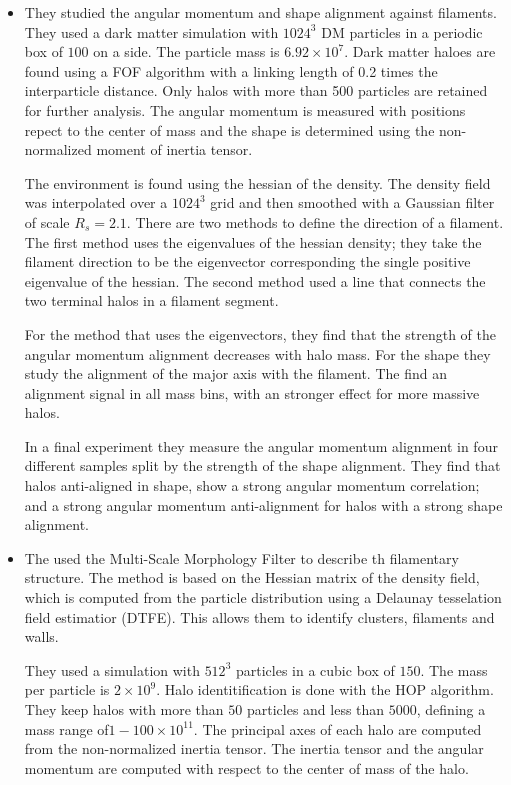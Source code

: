 \documentclass[useAMS,usenatbib]{mn2e}
\newcommand{\hMpc}{{\ifmmode{h^{-1}{\rm Mpc}}\else{$h^{-1}$Mpc }\fi}}
\newcommand{\hMsun}{{\ifmmode{h^{-1}{\rm
        {M_{\odot}}}}\else{$h^{-1}{\rm{M_{\odot}}}$~}\fi}}
\begin{document}
\begin{itemize}
\item
\citep{Zhang2009}

They studied the angular momentum and shape alignment against
filaments.  They used a dark matter simulation with $1024^3$ DM particles in a
periodic box of $100$ \hMpc on a side. The particle mass is
$6.92\times10^{7}$\hMsun. Dark matter haloes are found using a FOF
algorithm with a linking length of 0.2 times the interparticle
distance. Only halos with more than 500 particles are retained for
further analysis. The angular momentum is measured with positions
repect to the center of mass and the shape is determined using the
non-normalized moment of inertia tensor.

The environment is found using the hessian of the density. The density
field was interpolated over a $1024^3$ grid and then smoothed with a
Gaussian filter of scale $R_{s} = 2.1$\hMpc. There are two methods to
define the direction of a filament. The first method uses the
eigenvalues of the hessian density; they take the filament
direction to be the eigenvector corresponding the single positive
eigenvalue of the hessian. The second method used a line that
connects the two terminal halos in a filament segment.

For the method that uses the eigenvectors, they find that the strength
of the angular momentum alignment decreases with halo mass. For the
shape they study the alignment of the major axis with the
filament. The find an alignment signal in all mass bins, with an
stronger effect for more massive halos. 

In a final experiment they measure the angular momentum alignment in four
different samples split by the strength of the shape alignment. They
find that halos anti-aligned in shape, show a strong angular momentum
correlation; and a strong angular momentum anti-alignment for halos
with a strong shape alignment.

\item
\citep{AragonCalvo2007}


The used the Multi-Scale Morphology Filter to describe th filamentary
structure. The method is based on the Hessian matrix of the density
field, which is computed from the particle distribution using a
Delaunay tesselation field estimatior (DTFE). This allows them to
identify clusters, filaments and walls.

They used a simulation with $512^3$ particles in a cubic box of $150$\hMpc. The
mass per particle is $2\times 10^{9}$\hMsun.  Halo identitification is
done with the HOP algorithm. They keep halos with more than $50$
particles and less than $5000$, defining a mass range of$1-100\times
10^{11}$\hMsun. The principal axes of each halo are computed from the
non-normalized inertia tensor. The inertia tensor and the angular
momentum are computed with respect to the center of mass of the halo. 


\end{itemize}
\end{document}
